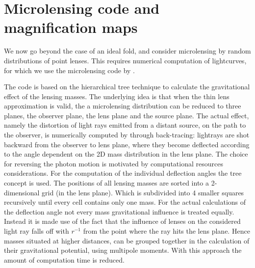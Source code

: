 \section{Microlensing code and magnification maps}

We now go beyond the case of an ideal fold, and consider microlensing
by random distributions of point lenses.  This requires numerical
computation of lightcurves, for which we use the microlensing code by
\cite{1999A&A...346L...5W}.




The code is based on the hierarchical tree technique to calculate the
gravitational effect of the lensing masses. The underlying idea is
that when the thin lens approximation is valid, the a microlensing
distribution can be reduced to three planes, the observer plane, the
lens plane and the source plane. The actual effect, namely the
distortion of light rays emitted from a distant source, on the path to
the observer, is numerically computed by through back-tracing:
lightrays are shot backward from the observer to lens plane, where
they become deflected according to the angle dependent on the 2D mass
distribution in the lens plane.  The choice for reversing the photon
motion is motivated by computational resources considerations.  For
the computation of the individual deflection angles the tree concept
is used. The positions of all lensing masses are sorted into a
2-dimensional grid (in the lens plane). Which is subdivided into 4
smaller squares recursively until every cell contains only one
mass. For the actual calculations of the deflection angle not every
mass gravitational influence is treated equally. Instead it is made
use of the fact that the influence of lenses on the considered light
ray falls off with $r^{-1}$ from the point where the ray hits the lens
plane. Hence masses situated at higher distances, can be grouped
together in the calculation of their gravitational potential, using
multipole moments. With this approach the amount of computation time
is reduced. \\



